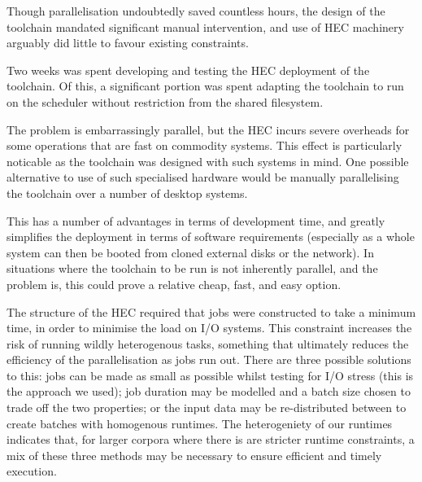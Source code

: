 
Though parallelisation undoubtedly saved countless hours, the design of the toolchain mandated significant manual intervention, and use of HEC machinery arguably did little to favour existing constraints.

Two weeks was spent developing and testing the HEC deployment of the toolchain.  Of this, a significant portion was spent adapting the toolchain to run on the scheduler without restriction from the shared filesystem.



The problem is embarrassingly parallel, but the HEC incurs severe overheads for some operations that are fast on commodity systems.  This effect is particularly noticable as the toolchain was designed with such systems in mind.  One possible alternative to use of such specialised hardware would be manually parallelising the toolchain over a number of desktop systems.  

This has a number of advantages in terms of development time, and greatly simplifies the deployment in terms of software requirements (especially as a whole system can then be booted from cloned external disks or the network).  In situations where the toolchain to be run is not inherently parallel, and the problem is, this could prove a relative cheap, fast, and easy option.


The structure of the HEC required that jobs were constructed to take a minimum time, in order to minimise the load on I/O systems.  This constraint increases the risk of running wildly heterogenous tasks, something that ultimately reduces the efficiency of the parallelisation as jobs run out.  There are three possible solutions to this: jobs can be made as small as possible whilst testing for I/O stress (this is the approach we used); job duration may be modelled and a batch size chosen to trade off the two properties; or the input data may be re-distributed between to create batches with homogenous runtimes.  The heterogeniety of our runtimes indicates that, for larger corpora where there is are stricter runtime constraints, a mix of these three methods may be necessary to ensure efficient and timely execution.

